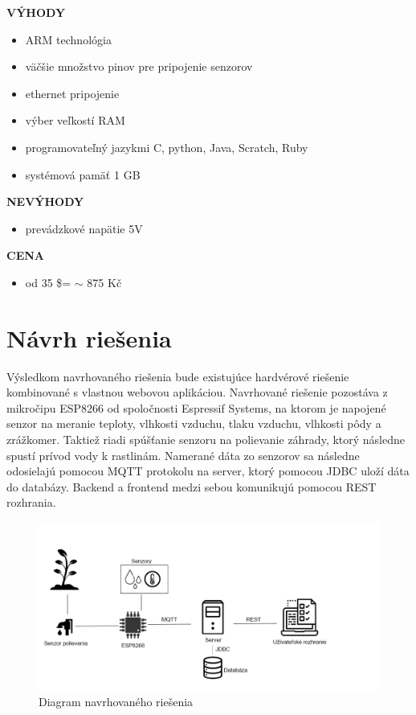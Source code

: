 \documentclass[twoside]{ctuthesis}
\theoremstyle{plain}
\theoremstyle{definition}
\theoremstyle{note}
\begin{document}
\textbf{VÝHODY}
\begin{itemize}
\item ARM technológia
\item väčšie množstvo pinov pre pripojenie senzorov
\item ethernet pripojenie
\item výber veľkostí RAM
\item programovateľný jazykmi C, python, Java, Scratch, Ruby
\item systémová pamäť 1 GB
\end{itemize}

\textbf{NEVÝHODY}
\begin{itemize}
\item prevádzkové napätie 5V
\end{itemize}

\textbf{CENA}
\begin{itemize}
\item od 35 \$= $\sim$ 875 Kč
\end{itemize}

\chapter{Návrh riešenia}

Výsledkom navrhovaného riešenia bude existujúce hardvérové riešenie kombinované s vlastnou webovou aplikáciou. Navrhované riešenie pozostáva z mikročipu ESP8266 od spoločnosti Espressif Systems, na ktorom je napojené senzor na meranie teploty, vlhkosti vzduchu, tlaku vzduchu, vlhkosti pôdy a zrážkomer. Taktiež riadi spúšťanie senzoru na polievanie záhrady, ktorý následne spustí prívod vody k rastlinám. Namerané dáta zo senzorov sa následne odosielajú pomocou MQTT protokolu na server, ktorý pomocou JDBC uloží dáta do databázy. Backend a frontend medzi sebou komunikujú pomocou REST rozhrania.

\begin{figure}[H]
\includegraphics[width= 14 cm]{navrh.png}
\caption{Diagram navrhovaného riešenia}
\label{fig:navrh}
\end{figure}
\end{document}
